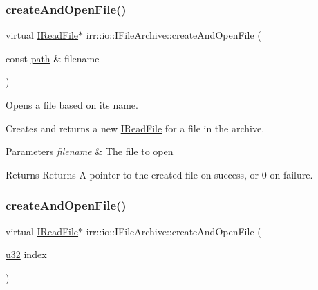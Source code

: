 \subsubsection{\texorpdfstring{create\+And\+Open\+File()}{createAndOpenFile()}\hspace{0.1cm}{\footnotesize\ttfamily [2/4]}}
{\footnotesize\ttfamily virtual \hyperlink{classirr_1_1io_1_1IReadFile}{I\+Read\+File}$\ast$ irr\+::io\+::\+I\+File\+Archive\+::create\+And\+Open\+File (\begin{DoxyParamCaption}\item[{const \hyperlink{namespaceirr_1_1io_a6468281622ce3a1c46b72e19f32dded5}{path} \&}]{filename }\end{DoxyParamCaption})\hspace{0.3cm}{\ttfamily [pure virtual]}}



Opens a file based on its name. 

Creates and returns a new \hyperlink{classirr_1_1io_1_1IReadFile}{I\+Read\+File} for a file in the archive. 
\begin{DoxyParams}{Parameters}
{\em filename} & The file to open \\
\hline
\end{DoxyParams}
\begin{DoxyReturn}{Returns}
Returns A pointer to the created file on success, or 0 on failure. 
\end{DoxyReturn}
\mbox{\label{classirr_1_1io_1_1IFileArchive_ab6bc8fbd660bbbe42b4d30a9d4f26c7d}} 
\subsubsection{\texorpdfstring{create\+And\+Open\+File()}{createAndOpenFile()}\hspace{0.1cm}{\footnotesize\ttfamily [3/4]}}
{\footnotesize\ttfamily virtual \hyperlink{classirr_1_1io_1_1IReadFile}{I\+Read\+File}$\ast$ irr\+::io\+::\+I\+File\+Archive\+::create\+And\+Open\+File (\begin{DoxyParamCaption}\item[{\hyperlink{namespaceirr_a0416a53257075833e7002efd0a18e804}{u32}}]{index }\end{DoxyParamCaption})\hspace{0.3cm}{\ttfamily [pure virtual]}}



